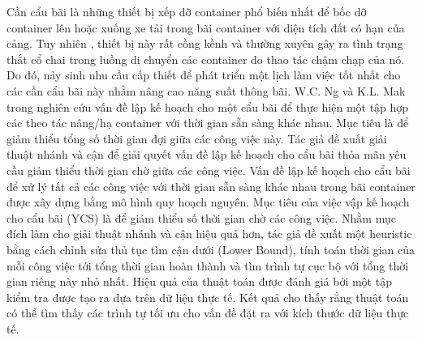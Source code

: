 \documentclass[11pt]{article}
\begin{document}
Cần cẩu bãi là những thiết bị xếp dỡ container phổ biến nhất để bốc dỡ container lên hoặc xuống xe tải trong bãi container với diện tích đất có hạn của cảng. Tuy nhiên , thiết bị này rất cồng kềnh và thường xuyên gây ra tình trạng thắt cổ chai trong luồng di chuyển các container do thao tác chậm chạp của nó. Do đó, nảy sinh nhu cầu cấp thiết để phát triển một lịch làm việc tốt nhất cho các cần cẩu bãi này nhằm nâng cao năng suất thông bãi.
W.C. Ng và K.L. Mak trong \cite{Ng:Mak:2003} nghiên cứu vấn đề lập kế hoạch cho một cẩu bãi để thực hiện một tập hợp các theo tác nâng/hạ container với thời gian sẵn sàng khác nhau. Mục tiêu là để giảm thiểu tổng số thời gian đợi giữa các công việc này.
Tác giả đề xuất giải thuật nhánh và cận để giải quyết vấn đề lập kế hoạch cho cẩu bãi thỏa mãn yêu cầu giảm thiểu thời gian chờ giữa các công việc.
Vấn đề lập kế hoạch cho cẩu bãi để xử lý tất cả các công việc với thời gian sẵn sàng khác nhau trong bãi container được xây dựng bằng mô hình quy hoạch nguyên. 
Mục tiêu của việc vập kế hoạch cho cẩu bãi (YCS) là để giảm thiểu số thời gian chờ các công việc. 
Nhằm mục đích làm cho giải thuật nhánh và cận hiệu quả hơn, tác giả đề xuất một heuristic bằng cách chỉnh sửa thủ tục tìm cận dưới (Lower Bound), tính toán thời gian của mỗi công việc tới tổng thời gian hoàn thành và tìm trình tự cục bộ với tổng thời gian riêng này nhỏ nhất. 
Hiệu quả của thuật toán được đánh giá bởi một tập kiểm tra được tạo ra dựa trên dữ liệu thực tế.
Kết quả cho thấy rằng thuật toán có thể tìm thấy các trình tự tối ưu cho vấn đề đặt ra với  kích thước dữ liệu thực tế.\\
\end{document}
